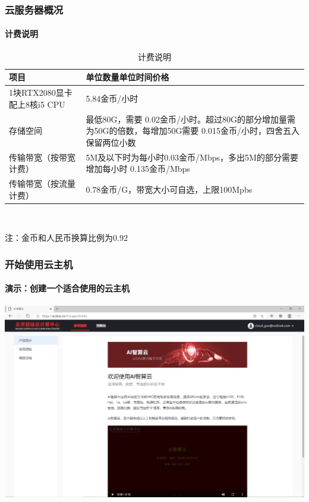 \documentclass[10pt]{beamer}
\begin{document}
    \begin{frame}
        \frametitle{云服务器概况}
            \framesubtitle{计费说明}

            {\small
            \begin{table}[h]
                {\centering
                \caption{计费说明}\label{tab:tab1}
                    \begin{tabular}{|p{}|p{}|}
                        \hline
                        项目 & 单位数量单位时间价格 \\
                        \hline
                        1块RTX2080显卡配上8核i5 CPU & 5.84金币/小时 \\
                        \hline
                        存储空间 & 最低80G，需要 0.02金币/小时。超过80G的部分增加量需为50G的倍数，每增加50G需要 0.015金币/小时，四舍五入保留两位小数 \\
                        \hline
                        传输带宽（按带宽计费） & 5M及以下时为每小时0.03金币/Mbps，多出5M的部分需要增加每小时 0.135金币/Mbps \\
                        \hline
                        传输带宽（按流量计费） & 0.78金币/G，带宽大小可自选，上限100Mpbs \\
                        \hline
                    \end{tabular} \\
                }
            \end{table}
            {\tiny \qquad \qquad 注：金币和人民币换算比例为0.92}
            }

    \end{frame}

    \begin{frame}
        \frametitle{开始使用云主机}
            \framesubtitle{演示：创建一个适合使用的云主机}

            \centering
            \href{https://ai.blsc.cn/\#/support/info}{
                \includegraphics[scale=0.2]{src/img/Welcome.png}
                }

    \end{frame}
\end{document}
